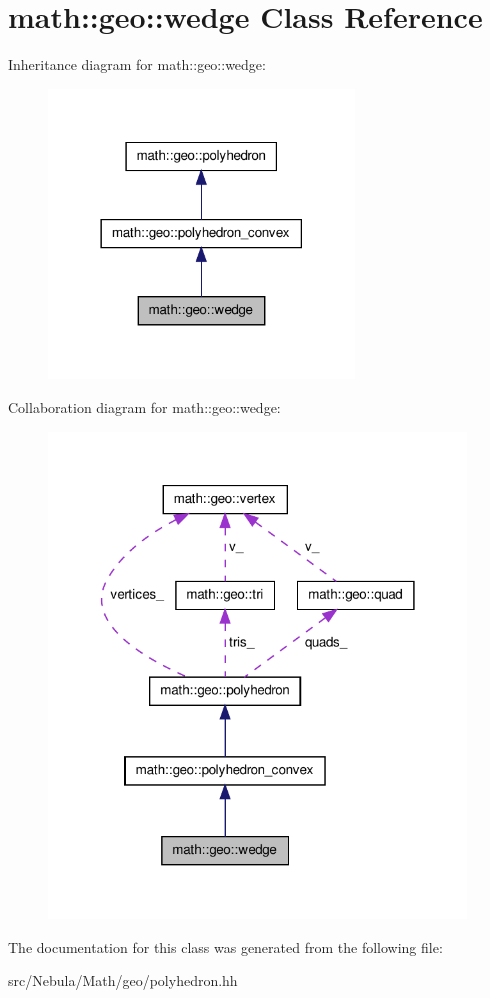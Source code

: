 \hypertarget{classmath_1_1geo_1_1wedge}{\section{math\-:\-:geo\-:\-:wedge \-Class \-Reference}
\label{classmath_1_1geo_1_1wedge}
}


\-Inheritance diagram for math\-:\-:geo\-:\-:wedge\-:\nopagebreak
\begin{figure}[H]
\begin{center}
\leavevmode
\includegraphics[width=230pt]{classmath_1_1geo_1_1wedge__inherit__graph}
\end{center}
\end{figure}


\-Collaboration diagram for math\-:\-:geo\-:\-:wedge\-:\nopagebreak
\begin{figure}[H]
\begin{center}
\leavevmode
\includegraphics[width=314pt]{classmath_1_1geo_1_1wedge__coll__graph}
\end{center}
\end{figure}


\-The documentation for this class was generated from the following file\-:\begin{DoxyCompactItemize}
\item 
src/\-Nebula/\-Math/geo/polyhedron.\-hh\end{DoxyCompactItemize}
